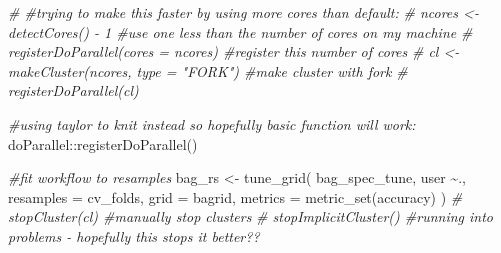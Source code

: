 \documentclass[
]{article}
\newenvironment{Shaded}{\begin{snugshade}}{\end{snugshade}}
\newcommand{\AttributeTok}[1]{\textcolor[rgb]{0.77,0.63,0.00}{#1}}
\newcommand{\CommentTok}[1]{\textcolor[rgb]{0.56,0.35,0.01}{\textit{#1}}}
\newcommand{\FunctionTok}[1]{\textcolor[rgb]{0.00,0.00,0.00}{#1}}
\newcommand{\NormalTok}[1]{#1}
\newcommand{\OtherTok}[1]{\textcolor[rgb]{0.56,0.35,0.01}{#1}}
\newcommand{\SpecialCharTok}[1]{\textcolor[rgb]{0.00,0.00,0.00}{#1}}
\begin{document}
\begin{Shaded}
\begin{Highlighting}[]
\CommentTok{\# \#trying to make this faster by using more cores than default:}
\CommentTok{\# ncores \textless{}{-} detectCores() {-} 1 \#use one less than the number of cores on my machine}
\CommentTok{\# registerDoParallel(cores = ncores) \#register this number of cores}
\CommentTok{\# cl \textless{}{-} makeCluster(ncores, type = "FORK") \#make cluster with fork}
\CommentTok{\# registerDoParallel(cl)}

\CommentTok{\#using taylor to knit instead so hopefully basic function will work:}
\NormalTok{doParallel}\SpecialCharTok{::}\FunctionTok{registerDoParallel}\NormalTok{()}

\CommentTok{\#fit workflow to resamples}
\NormalTok{bag\_rs }\OtherTok{\textless{}{-}} \FunctionTok{tune\_grid}\NormalTok{(}
\NormalTok{  bag\_spec\_tune,}
\NormalTok{  user }\SpecialCharTok{\textasciitilde{}}\NormalTok{.,}
  \AttributeTok{resamples =}\NormalTok{ cv\_folds,}
  \AttributeTok{grid =}\NormalTok{ bagrid,}
  \AttributeTok{metrics =} \FunctionTok{metric\_set}\NormalTok{(accuracy)}
\NormalTok{)}
\CommentTok{\# stopCluster(cl) \#manually stop clusters}
\CommentTok{\# stopImplicitCluster() \#running into problems {-} hopefully this stops it better??}
\end{Highlighting}
\end{Shaded}

\begin{Shaded}
\end{Shaded}
\end{document}

